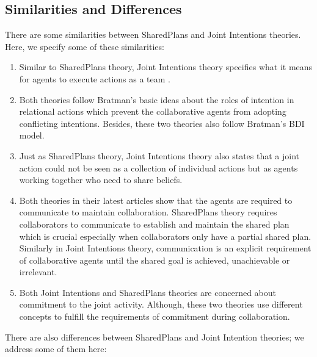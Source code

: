 \documentclass[12pt]{report}
\begin{document}
\subsection{Similarities and Differences}

There are some similarities between SharedPlans and Joint Intentions theories.
Here, we specify some of these similarities:

\begin{enumerate}
  \item Similar to SharedPlans theory, Joint Intentions theory specifies what it
  means for agents to execute actions as a team
  \cite{subramanian:joint-intention-dialogue}.
  
  \item Both theories follow Bratman's basic ideas about the roles of intention
  in relational actions which prevent the collaborative agents from adopting
  conflicting intentions. Besides, these two theories also follow Bratman's
  BDI model.
  
  \item Just as SharedPlans theory, Joint Intentions theory also states that a
  joint action could not be seen as a collection of individual actions but as
  agents working together who need to share beliefs.
  
  \item Both theories in their latest articles show that the agents are required
  to communicate to maintain collaboration. SharedPlans theory requires
  collaborators to communicate to establish and maintain the shared plan which
  is crucial especially when collaborators only have a partial shared plan.
  Similarly in Joint Intentions theory, communication is an explicit requirement
  of collaborative agents until the shared goal is achieved, unachievable or
  irrelevant.
  
  \item Both Joint Intentions and SharedPlans theories are concerned about
  commitment to the joint activity. Although, these two theories use different
  concepts to fulfill the requirements of commitment during collaboration.
\end{enumerate}

There are also differences between SharedPlans and Joint Intention theories;
we address some of them here:
\end{document}
